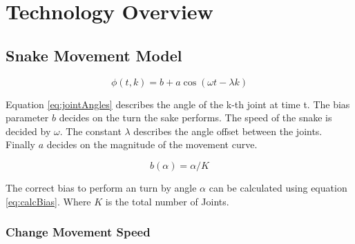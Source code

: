 \chapter{Technology Overview}
\label{section:theory}

\section{Snake Movement Model}


\begin{equation} \label{eq:jointAngles}
\phi\left(t, k\right) = b + a \cos \left(\omega t - \lambda k\right)
\end{equation}

Equation \ref{eq:jointAngles} describes the angle of the k-th joint at time t. The bias parameter $ b $ decides on the turn the sake performs. The speed of the snake is decided by $ \omega$. The constant $\lambda $ describes the angle offset between the joints. Finally $ a $ decides on the magnitude of the movement curve.

\begin{equation} \label{eq:calcBias}
b\left(\alpha\right) = \alpha / K
\end{equation}

The correct bias to perform an turn by angle $ \alpha $ can be calculated using equation \ref{eq:calcBias}. Where $ K $ is the total number of Joints.


\subsection{Change Movement Speed}


